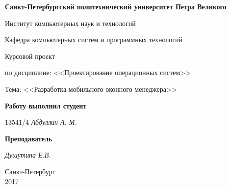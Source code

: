 \begin{titlepage}
\begin{center}

\textbf{Санкт-Петербургский политехнический университет Петра Великого}

\vspace{5mm}
Институт компьютерных наук и технологий

\vspace{5mm}
Кафедра компьютерных систем и программных технологий

\vspace*{\fill}

\huge{Курсовой проект}


\large{по дисциплине: <<Проектирование операционных систем>>}

\vspace*{2mm}
\large{Тема: <<Разработка мобильного оконного менеджера>>}

\vspace*{\fill}
\end{center}

\begin{large}
\hspace{0.4\linewidth} \textbf{Работу выполнил студент}

\vspace{5mm}
\hspace{0.4\linewidth} 13541/4 \hspace{1cm} \textit{Абдуллин А. М.}

\vspace{3mm}
\hspace{0.4\linewidth} \textbf{Преподаватель}

\vspace{5mm}
\hspace{0.4\linewidth} \underline{\hspace{2cm} } \hspace{3mm} \textit{Душутина Е.В.}
\end{large}

\vspace*{3cm}

\begin{center}
\normalsize Санкт-Петербург\\2017
\end{center}
\end{titlepage}